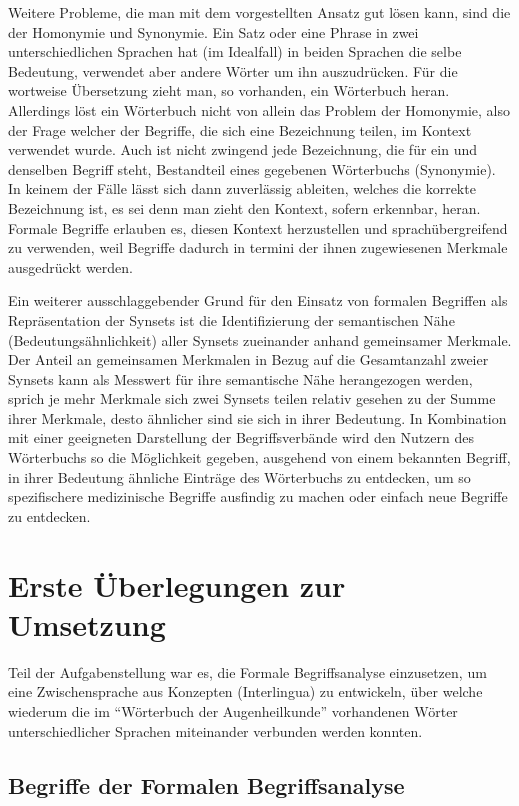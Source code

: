 \documentclass[pagesize,paper=A4,DIV=calc,fontsize=12pt,draft=false]{scrreprt}
\begin{document}
Weitere Probleme, die man mit dem vorgestellten Ansatz gut lösen kann, sind die der Homonymie und Synonymie. 
Ein Satz oder eine Phrase in zwei unterschiedlichen Sprachen hat (im Idealfall) in beiden Sprachen die selbe Bedeutung, verwendet aber andere Wörter um ihn auszudrücken. 
Für die wortweise Übersetzung zieht man, so vorhanden, ein Wörterbuch heran. 
Allerdings löst ein Wörterbuch nicht von allein das Problem der Homonymie, also der Frage welcher der Begriffe, die sich eine Bezeichnung teilen, im Kontext verwendet wurde. 
Auch ist nicht zwingend jede Bezeichnung, die für ein und denselben Begriff steht, Bestandteil eines gegebenen Wörterbuchs (Synonymie). 
In keinem der Fälle lässt sich dann zuverlässig ableiten, welches die korrekte Bezeichnung ist, es sei denn man zieht den Kontext, sofern erkennbar, heran. 
Formale Begriffe erlauben es, diesen Kontext herzustellen und sprachübergreifend zu verwenden, weil Begriffe dadurch in termini der ihnen zugewiesenen Merkmale ausgedrückt werden. 

Ein weiterer ausschlaggebender Grund für den Einsatz von formalen Begriffen als Repräsentation der Synsets ist die Identifizierung der semantischen Nähe (Bedeutungsähnlichkeit) aller Synsets zueinander anhand gemeinsamer Merkmale. 
Der Anteil an gemeinsamen Merkmalen in Bezug auf die Gesamtanzahl zweier Synsets kann als Messwert für ihre semantische Nähe herangezogen werden, sprich je mehr Merkmale sich zwei Synsets teilen relativ gesehen zu der Summe ihrer Merkmale, desto ähnlicher sind sie sich in ihrer Bedeutung. 
In Kombination mit einer geeigneten Darstellung der Begriffsverbände wird den Nutzern des Wörterbuchs so die Möglichkeit gegeben, ausgehend von einem bekannten Begriff, in ihrer Bedeutung ähnliche Einträge des Wörterbuchs zu entdecken, um so spezifischere medizinische Begriffe ausfindig zu machen oder einfach neue Begriffe zu entdecken. 

\section{Erste Überlegungen zur Umsetzung}

Teil der Aufgabenstellung war es, die Formale Begriffsanalyse einzusetzen, um eine Zwischensprache aus Konzepten (Interlingua) zu entwickeln, über welche wiederum die im \enquote{Wörterbuch der Augenheilkunde} vorhandenen Wörter unterschiedlicher Sprachen miteinander verbunden werden konnten.

\subsection{Begriffe der Formalen Begriffsanalyse}
\label{subsec:fba}
\end{document}

